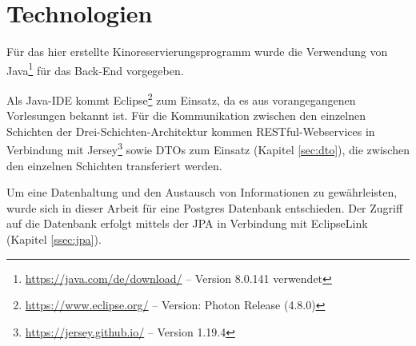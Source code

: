 \section{Technologien}
\label{sec:technologien}

Für das hier erstellte Kinoreservierungsprogramm wurde die Verwendung von Java\footnote{\url{https://java.com/de/download/} -- Version 8.0.141 verwendet} für das Back-End vorgegeben. 

Als Java-\acs{IDE} kommt Eclipse\footnote{\url{https://www.eclipse.org/} -- Version: Photon Release (4.8.0)} zum Einsatz, da es aus vorangegangenen Vorlesungen bekannt ist.
Für die Kommunikation zwischen den einzelnen Schichten der Drei-Schichten-Architektur kommen \acs{REST}ful-Webservices in Verbindung mit Jersey\footnote{\url{https://jersey.github.io/} -- Version 1.19.4} sowie \acp{DTO} zum Einsatz (Kapitel \vref{sec:dto}), die zwischen den einzelnen Schichten transferiert werden.

Um eine Datenhaltung und den Austausch von Informationen zu gewährleisten, wurde sich in dieser Arbeit für eine Postgres Datenbank entschieden.
Der Zugriff auf die Datenbank erfolgt mittels der \ac{JPA} in Verbindung mit EclipseLink (Kapitel \vref{ssec:jpa}).